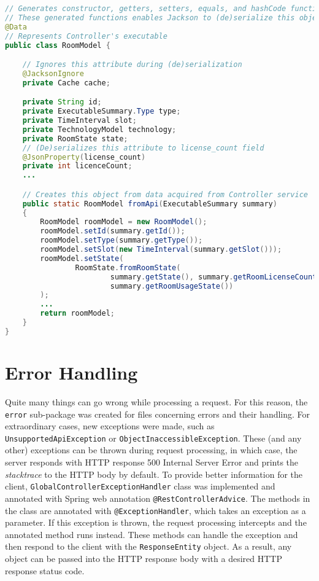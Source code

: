 \begin{lstlisting}[language=java, caption=RoomModel.java, label=lst:model]
// Generates constructor, getters, setters, equals, and hashCode functions
// These generated functions enables Jackson to (de)serialize this object
@Data
// Represents Controller's executable
public class RoomModel {

    // Ignores this attribute during (de)serialization
    @JacksonIgnore
    private Cache cache;

    private String id;
    private ExecutableSummary.Type type;
    private TimeInterval slot;
    private TechnologyModel technology;
    private RoomState state;
    // (De)serializes this attribute to license_count field
    @JsonProperty(license_count)
    private int licenceCount;
    ...

    // Creates this object from data acquired from Controller service
    public static RoomModel fromApi(ExecutableSummary summary)
    {
        RoomModel roomModel = new RoomModel();
        roomModel.setId(summary.getId());
        roomModel.setType(summary.getType());
        roomModel.setSlot(new TimeInterval(summary.getSlot()));
        roomModel.setState(
                RoomState.fromRoomState(
                        summary.getState(), summary.getRoomLicenseCount(),
                        summary.getRoomUsageState())
        );
        ...
        return roomModel;
    }
}
\end{lstlisting}


\section{Error Handling}
Quite many things can go wrong while processing a request. For this reason, the \texttt{error} sub-package was created for files concerning errors and their handling.
For extraordinary cases, new exceptions were made, such as \texttt{UnsupportedApiException} or \texttt{ObjectInaccessible\-Exception}.
These (and any other) exceptions can be thrown during request processing, in which case, the server responds with HTTP response 500 Internal Server Error and prints the \emph{stacktrace} to the HTTP body by default.
To provide better information for the client, \texttt{GlobalController\-ExceptionHandler} class was implemented and annotated with Spring web annotation \texttt{@RestControllerAdvice}.
The methods in the class are annotated with \texttt{@ExceptionHandler}, which takes an exception as a parameter. If this exception is thrown, the request processing intercepts and the annotated method runs instead.
These methods can handle the exception and then respond to the client with the \texttt{ResponseEntity} object. As a result, any object can be passed into the HTTP response body with a desired HTTP response status code.

